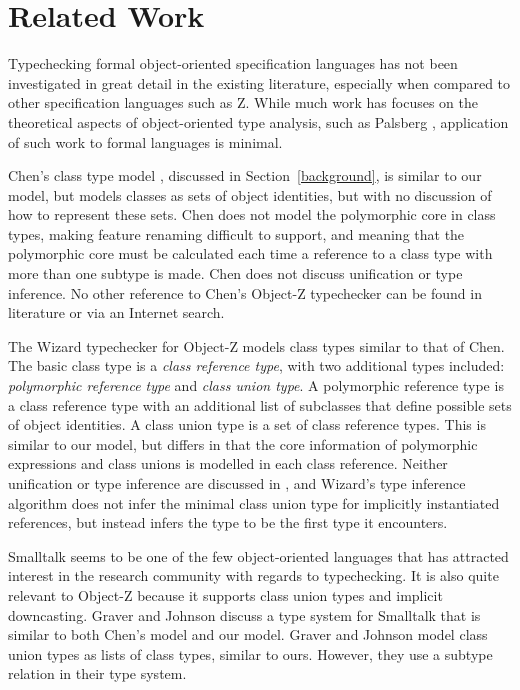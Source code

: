 \section{Related Work}

Typechecking formal object-oriented specification languages has not
been investigated in great detail in the existing literature,
especially when compared to other specification languages such as
Z. While much work has focuses on the theoretical aspects of
object-oriented type analysis, such as Palsberg \cite{palsberg95},
application of such work to formal languages is minimal.

Chen's class type model \cite{chen94}, discussed in
Section~\ref{background}, is similar to our model, but models classes
as sets of object identities, but with no discussion of how to
represent these sets. Chen does not model the polymorphic core in
class types, making feature renaming difficult to support, and meaning
that the polymorphic core must be calculated each time a reference to
a class type with more than one subtype is made. Chen does not discuss
unification or type inference. No other reference to Chen's Object-Z
typechecker can be found in literature or via an Internet search.

The Wizard typechecker for Object-Z \cite{johnston96} models class
types similar to that of Chen. The basic class type is a {\em class
reference type}, with two additional types included: {\em polymorphic
reference type} and {\em class union type}. A polymorphic reference
type is a class reference type with an additional list of subclasses
that define possible sets of object identities. A class union type is
a set of class reference types. This is similar to our model, but
differs in that the core information of polymorphic expressions and
class unions is modelled in each class reference. Neither unification
or type inference are discussed in \cite{johnston96}, and Wizard's
type inference algorithm does not infer the minimal class union type
for implicitly instantiated references, but instead infers the type to
be the first type it encounters.

Smalltalk \cite{goldberg83} seems to be one of the few object-oriented
languages that has attracted interest in the research community with
regards to typechecking. It is also quite relevant to Object-Z because
it supports class union types and implicit downcasting. Graver and
Johnson \cite{graver90} discuss a type system for Smalltalk that is
similar to both Chen's model and our model. Graver and Johnson model
class union types as lists of class types, similar to ours. However,
they use a subtype relation in their type system.

